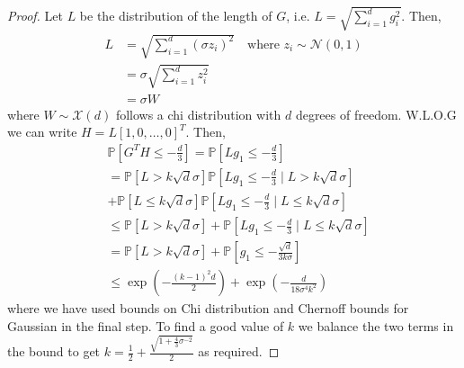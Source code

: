 \documentclass{article}
\theoremstyle{plain}
\theoremstyle{definition}
\theoremstyle{remark}
\begin{document}
\begin{proof}
    Let \( L \) be the distribution of the length of \( G \), i.e. \( L = \sqrt{\sum_{i=1}^{d} g_i^2}  \). Then,
    \begin{align}
        L &= \sqrt{\sum_{i=1}^{d}(\sigma z_i)^2} \quad \text{where } z_i\sim\mathcal{N}(0,1) \\
          &= \sigma\sqrt{\sum_{i=1}^{d}z_i^2} \\
          &= \sigma W
    \end{align}
    where \( W\sim\mathcal{X}(d) \) follows a chi distribution with \( d \) degrees of freedom.
    W.L.O.G we can write \( H=L[1, 0, \ldots, 0]^T \). Then,
    \begin{align}
        &\mathbb{P}\left[G^T H\leq-\frac{d}{3}\right] = \mathbb{P}\left[Lg_1 \leq -\frac{d}{3}\right] \\
        &= \mathbb{P}\left[L>k\sqrt{d}\sigma\right]\mathbb{P}\left[Lg_1\leq -\frac{d}{3} \mid L > k\sqrt{d}\sigma \right]\\ &+ \mathbb{P}\left[L\leq k\sqrt{d}\sigma\right]\mathbb{P}\left[Lg_1 \leq -\frac{d}{3}\mid L\leq k\sqrt{d}\sigma \right] \\
        &\leq \mathbb{P}\left[L>k\sqrt{d}\sigma\right] + \mathbb{P}\left[Lg_1 \leq -\frac{d}{3}\mid L\leq k\sqrt{d}\sigma \right] \\
        &= \mathbb{P}\left[L>k\sqrt{d}\sigma\right] + \mathbb{P}\left[g_1 \leq -\frac{\sqrt{d} }{3k \sigma }\right] \\
        &\leq \exp\left(-\frac{(k-1)^2d}{2}\right) + \exp\left(-\frac{d}{18\sigma^4k^2}\right)
    \end{align}
    where we have used bounds on Chi distribution  and Chernoff bounds for Gaussian in the final step.
    To find a good value of \( k \) we balance the two terms in the bound to get
      \(  k = \frac{1}{2} + \frac{\sqrt{1+\frac{4}{3}\sigma^{-2}}}{2} \) as required.
\end{proof}
\end{document}
